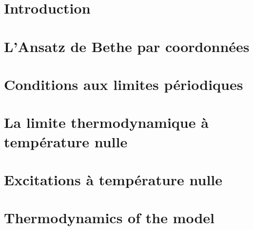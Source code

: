 
\section*{Introduction}


\section{L'Ansatz de Bethe par coordonnées}


\section{Conditions aux limites périodiques}


\section{La limite thermodynamique à température nulle}


\section{Excitations à température nulle}


\section{Thermodynamics of the model}























